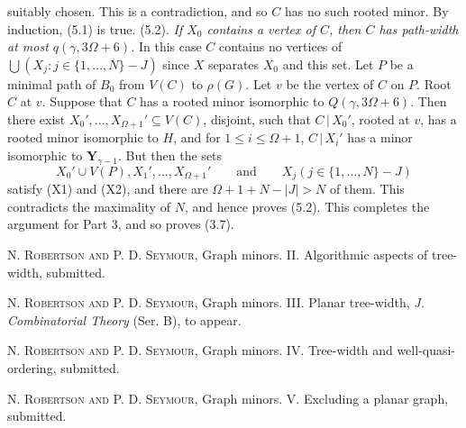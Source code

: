 \noindent suitably chosen. This is a contradiction, and so $C$ has no such rooted minor.
By induction, (5.1) is true.
\stmt
(5.2). \textit{If $X_0$ contains a vertex of $C$, then $C$ has path-width at most
$q(\gamma, 3\Omega+6)$.}
\stmt
In this case $C$ contains no vertices of $\bigcup(X_j\colon j\in\{1,..., N\}-J)$ since $X$
separates $X_0$ and this set. Let $P$ be a minimal path of $B_0$ from $V(C)$ to $\rho(G)$.
Let $v$ be the vertex of $C$ on $P$. Root $C$ at $v$. Suppose that $C$ has a rooted
minor isomorphic to $Q(\gamma, 3\Omega+6)$. Then there exist $X_0',..., X_{\Omega+1}'\subseteq V(C)$,
disjoint, such that $C\,|\,X_0'$, rooted at $v$, has a rooted minor isomorphic to $H$,
and for $1\le i\le\Omega+1$, $C\,|\,X_i'$ has a minor isomorphic to $\mathbf{Y}_{\gamma-1}$. But then the
sets
\begin{equation*}
X_0'\cup V(P), X_1',..., X_{\Omega+1}'\qquad\text{and}\qquad X_j(j\in\{1,..., N\}-J)
\end{equation*}
satisfy (X1) and (X2), and there are $\Omega+1+N-|J|>N$ of them. This
contradicts the maximality of $N$, and hence proves (5.2). This completes the
argument for Part 3, and so proves (3.7).


{
\newcommand{\refauth}{N. \textsc{Robertson and} P. D. \textsc{Seymour}}
\begin{list}{}{\leftmargin=16pt\itemsep=0pt\parsep=0pt}
\item[1.] \refauth, Graph minors. II. Algorithmic aspects of tree-width,
submitted.
\item[2.] \refauth, Graph minors. III. Planar tree-width, \textit{J.
Combinatorial Theory} (Ser. B), to appear.
\item[3.] \refauth, Graph minors. IV. Tree-width and well-quasi-ordering, submitted.
\item[4.] \refauth, Graph minors. V. Excluding a planar graph,
submitted.
\end{list}}
